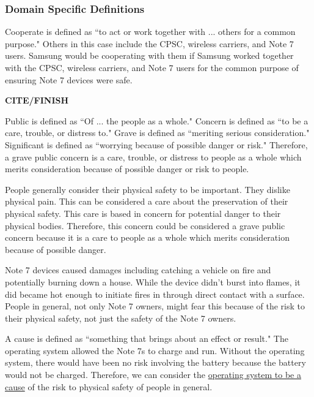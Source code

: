 \documentclass[12pt]{article}
\newcounter{subsubsubsection}[subsubsection]
\begin{document}
   \subsubsection{Domain Specific Definitions}
   
      Cooperate is defined as ``to act or work together with ... others for a common purpose."\cite{collinsDefineCooperate} Others in this case include the CPSC, wireless carriers, and Note 7 users. Samsung would be cooperating with them if Samsung worked together with the CPSC, wireless carriers, and Note 7 users for the common purpose of ensuring Note 7 devices were safe.
      
       {\bf CITE/FINISH}
      
      Public is defined as ``Of ... the people as a whole."\cite{oxfordDefinePublic} Concern is defined as ``to be a care, trouble, or distress to."\cite{oxfordDefineConcern} Grave is defined as ``meriting serious consideration."\cite{merriamDefineGrave} Significant is defined as ``worrying because of possible danger or risk."\cite{oxfordDefineSerious} Therefore, a grave public concern is a care, trouble, or distress to people as a whole which merits consideration because of possible danger or risk to people.
      
      People generally consider their physical safety to be important. They dislike physical pain. This can be considered a care about the preservation of their physical safety. This care is based in concern for potential danger to their physical bodies. Therefore, this concern could be considered a grave public concern because it is a care to people as a whole which merits consideration because of possible danger.
      
	Note 7 devices caused damages including catching a vehicle on fire and potentially burning down a house\cite{vergeDamagesCaused}. While the device didn't burst into flames, it did became hot enough to initiate fires in through direct contact with a surface\cite{cnetHotelDamages}. People in general, not only Note 7 owners, might fear this because of the risk to their physical safety, not just the safety of the Note 7 owners.
      
      A cause is defined as ``something that brings about an effect or result."\cite{merriamDefineCause} The operating system allowed the Note 7s to charge and run. Without the operating system, there would have been no risk involving the battery because the battery would not be charged. Therefore, we can consider the \uline{operating system to be a cause} of the risk to physical safety of people in general.
      
\end{document}
